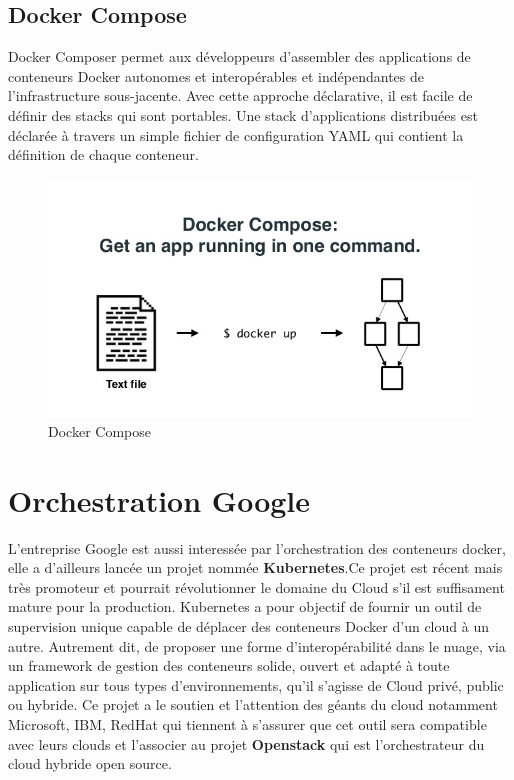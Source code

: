 \begin{onehalfspace}
\subsection{Docker Compose}
  Docker Composer permet aux développeurs d'assembler des applications de conteneurs Docker autonomes et interopérables et indépendantes de l'infrastructure sous-jacente. Avec cette approche déclarative, il est facile de définir des stacks qui sont portables. Une stack d'applications distribuées est déclarée à travers un simple fichier de configuration YAML qui contient la définition de chaque conteneur.
\begin{figure}[H]
\centering
\includegraphics [scale=0.5]{chapitre3/assets/dockercompose.jpg}
\caption{Docker Compose}
\end{figure}
\section{Orchestration Google}
L'entreprise Google est aussi interessée par l'orchestration des conteneurs docker, elle a d'ailleurs lancée un projet nommée \textbf{Kubernetes}.Ce projet est récent mais très promoteur et pourrait révolutionner le domaine du Cloud s'il est suffisament mature pour la production. Kubernetes a pour objectif de fournir un outil de supervision unique capable de déplacer des conteneurs Docker d'un cloud à un autre. Autrement dit, de proposer une forme d’interopérabilité dans le nuage, via un framework de gestion des conteneurs solide, ouvert et adapté à toute application sur tous types d’environnements, qu’il s’agisse de Cloud privé, public ou hybride. Ce projet a le soutien et l'attention des géants du cloud notamment Microsoft, IBM, RedHat qui tiennent à s'assurer que cet outil sera compatible avec leurs clouds et l'associer au projet \textbf{Openstack} qui est l'orchestrateur du cloud hybride open source.

\end{onehalfspace}
